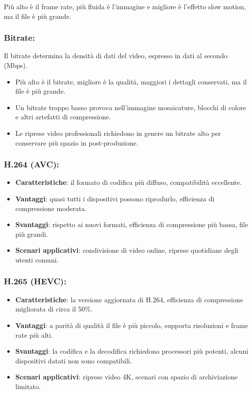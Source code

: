 Più alto è il frame rate, più fluida è l'immagine e migliore è l'effetto slow motion, ma il file è più grande.

\subsubsection*{Bitrate:}

Il bitrate determina la densità di dati del video, espresso in dati al secondo (Mbps).

\begin{itemize}
  \item Più alto è il bitrate, migliore è la qualità, maggiori i dettagli conservati, ma il file è più grande.
  \item Un bitrate troppo basso provoca nell'immagine mosaicature, blocchi di colore e altri artefatti di compressione.
  \item Le riprese video professionali richiedono in genere un bitrate alto per conservare più spazio in post-produzione.
\end{itemize}


\subsubsection*{H.264 (AVC):}

\begin{itemize}
  \item \textbf{Caratteristiche}: il formato di codifica più diffuso, compatibilità eccellente.
  \item \textbf{Vantaggi}: quasi tutti i dispositivi possono riprodurlo, efficienza di compressione moderata.
  \item \textbf{Svantaggi}: rispetto ai nuovi formati, efficienza di compressione più bassa, file più grandi.
  \item \textbf{Scenari applicativi}: condivisione di video online, riprese quotidiane degli utenti comuni.
\end{itemize}

\subsubsection*{H.265 (HEVC):}

\begin{itemize}
  \item \textbf{Caratteristiche}: la versione aggiornata di H.264, efficienza di compressione migliorata di circa il 50\%.
  \item \textbf{Vantaggi}: a parità di qualità il file è più piccolo, supporta risoluzioni e frame rate più alti.
  \item \textbf{Svantaggi}: la codifica e la decodifica richiedono processori più potenti, alcuni dispositivi datati non sono compatibili.
  \item \textbf{Scenari applicativi}: riprese video 4K, scenari con spazio di archiviazione limitato.
\end{itemize}


